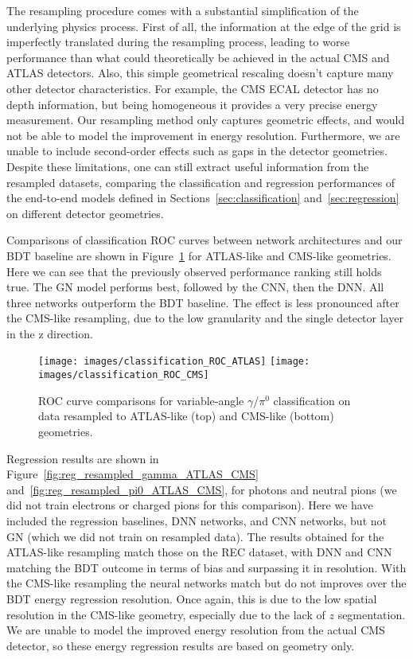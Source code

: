The resampling procedure comes with a substantial simplification of the underlying physics process. First of all, the information at the edge of the grid is imperfectly translated during the resampling process, leading to worse performance than what could theoretically be achieved in the actual CMS and ATLAS detectors. Also, this simple geometrical rescaling doesn't capture many other detector characteristics. For example, the CMS ECAL detector has no depth information, but being homogeneous it provides a very precise energy measurement. Our resampling method only captures geometric effects, and would not be able to model the improvement in energy resolution. Furthermore, we are unable to include second-order effects such as gaps in the detector geometries. Despite these limitations, one can still extract useful information from the resampled datasets, comparing the classification and regression performances of the end-to-end models defined in Sections~\ref{sec:classification} and~\ref{sec:regression} on different detector geometries.

Comparisons of classification ROC curves between network architectures and our BDT baseline are shown in Figure~\ref{fig:class_ROC_ATLAS_CMS} for ATLAS-like and CMS-like geometries. Here we can see that the previously observed performance ranking still holds true. The GN
model performs best, followed by the CNN, then the DNN. All three networks outperform the BDT baseline. The effect is less pronounced after the CMS-like resampling, due to the low granularity and the single detector layer in the z direction.

\begin{figure}[htbp]
    \centering
    \texttt{[image: images/classification\_ROC\_ATLAS]}
    \texttt{[image: images/classification\_ROC\_CMS]}
    \caption{ROC curve comparisons for variable-angle $\gamma$/$\pi^0$ classification on data resampled to ATLAS-like (top) and CMS-like (bottom) geometries.}
    \label{fig:class_ROC_ATLAS_CMS}
\end{figure}

Regression results are shown in Figure~\ref{fig:reg_resampled_gamma_ATLAS_CMS} and~\ref{fig:reg_resampled_pi0_ATLAS_CMS}, for photons and neutral pions (we did not train electrons or charged pions for this comparison). Here we have included the regression baselines, DNN networks, and CNN networks, but not GN (which we did not train on resampled data). The results obtained for the ATLAS-like resampling match those on the REC dataset, with DNN and CNN matching the BDT outcome in terms of bias and surpassing it in resolution. With the CMS-like resampling the neural networks match but do not improves over the BDT energy regression resolution. Once again, this is due to the low spatial resolution in the CMS-like geometry, especially due to the lack of $z$ segmentation. We are unable to model the improved energy resolution from the actual CMS detector, so these energy regression results are based on geometry only.


